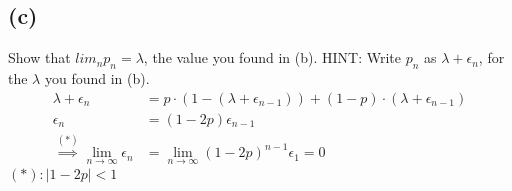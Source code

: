 \documentclass{article}
\begin{document}
\subsection*{(c)}
Show that $lim_np_n = \lambda$, the value you found in (b). HINT: Write $p_n$ as $\lambda+\epsilon_n$, for the $\lambda$ you found in (b).
\color{blue}
\begin{equation*}
\begin{split}
    \lambda+\epsilon_n &= p\cdot(1-(\lambda+\epsilon_{n-1}))+(1-p)\cdot (\lambda+\epsilon_{n-1})\\
    \epsilon_n &= (1-2p)\epsilon_{n-1}\\
    \stackrel{(*)}{\implies} \lim_{n\rightarrow{\infty}} \epsilon_{n} &= \lim_{n\rightarrow\infty}(1-2p)^{n-1}\epsilon_1 = 0
\end{split}
\end{equation*}
$(*):|1-2p|<1$
\end{document}
